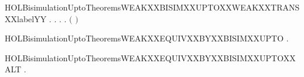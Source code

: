 \begin{SaveVerbatim}{HOLBisimulationUptoTheoremsWEAKXXBISIMXXUPTOXXWEAKXXTRANSXXlabelYY}
\HOLTokenTurnstile{} \HOLSymConst{\HOLTokenForall{}}.
         \HOLSymConst{\HOLTokenImp{}}
       \HOLSymConst{\HOLTokenForall{}} .
              \HOLSymConst{\HOLTokenImp{}}
           \HOLSymConst{\HOLTokenForall{}} .
                \HOLTokenWeakTransBegin{} \HOLTokenWeakTransEnd {} \HOLSymConst{\HOLTokenImp{}}
               \HOLSymConst{\HOLTokenExists{}}.
                    \HOLTokenWeakTransBegin{} \HOLTokenWeakTransEnd {} \HOLSymConst{\HOLTokenConj{}}
                   \ensuremath{(}    \ensuremath{)}  
\end{SaveVerbatim}
\newcommand{\HOLBisimulationUptoTheoremsWEAKXXBISIMXXUPTOXXWEAKXXTRANSXXlabelYY}{\UseVerbatim{HOLBisimulationUptoTheoremsWEAKXXBISIMXXUPTOXXWEAKXXTRANSXXlabelYY}}
\begin{SaveVerbatim}{HOLBisimulationUptoTheoremsWEAKXXEQUIVXXBYXXBISIMXXUPTO}
\HOLTokenTurnstile{} \HOLSymConst{\HOLTokenForall{}}  .   \HOLSymConst{\HOLTokenConj{}}    \HOLSymConst{\HOLTokenImp{}}   
\end{SaveVerbatim}
\newcommand{\HOLBisimulationUptoTheoremsWEAKXXEQUIVXXBYXXBISIMXXUPTO}{\UseVerbatim{HOLBisimulationUptoTheoremsWEAKXXEQUIVXXBYXXBISIMXXUPTO}}
\begin{SaveVerbatim}{HOLBisimulationUptoTheoremsWEAKXXEQUIVXXBYXXBISIMXXUPTOXXALT}
\HOLTokenTurnstile{} \HOLSymConst{\HOLTokenForall{}}  .   \HOLSymConst{\HOLTokenConj{}}    \HOLSymConst{\HOLTokenImp{}}   
\end{SaveVerbatim}
\newcommand{\HOLBisimulationUptoTheoremsWEAKXXEQUIVXXBYXXBISIMXXUPTOXXALT}{\UseVerbatim{HOLBisimulationUptoTheoremsWEAKXXEQUIVXXBYXXBISIMXXUPTOXXALT}}
